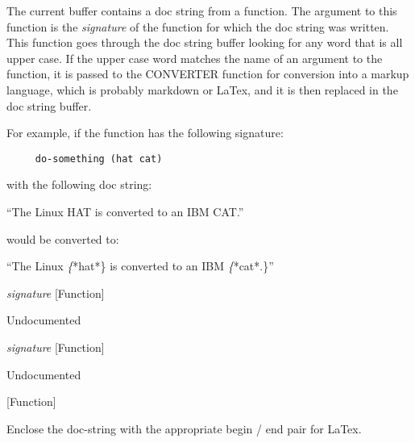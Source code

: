 \begin{doc-string}
The current buffer contains a doc string from a function.  The argument to this
function is the \emph{signature} of the function for which the doc string was written.
This function goes through the doc string buffer looking for any word that is all
upper case.  If the upper case word matches the name of an argument to the function,
it is passed to the CONVERTER function for conversion into a markup language, which
is probably markdown or LaTex, and it is then replaced in the doc string buffer.

For example, if the function has the following signature:

\begin{verbatim}
     do-something (hat cat)
\end{verbatim}

with the following doc string:

  ``The Linux HAT is converted to an IBM CAT.''

would be converted to:

  ``The Linux \emph\{*hat*\} is converted to an IBM \emph\{*cat*.\}''
\end{doc-string}

\vspace{1em}
\noindent
{}
\usebox{\funcname}\emph{signature}
 \hfill [Function]

\begin{doc-string}
Undocumented
\end{doc-string}

\vspace{1em}
\noindent
{}
\usebox{\funcname}\emph{signature}
 \hfill [Function]

\begin{doc-string}
Undocumented
\end{doc-string}

\vspace{1em}
\noindent
{}
\usebox{\funcname}
 \hfill [Function]

\begin{doc-string}
Enclose the doc-string with the appropriate begin / end pair for LaTex.
\end{doc-string}

